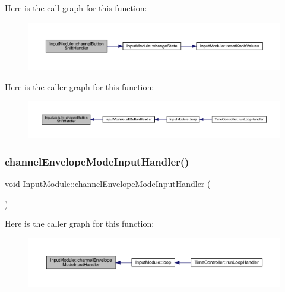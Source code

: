 Here is the call graph for this function\+:
\nopagebreak
\begin{figure}[H]
\begin{center}
\leavevmode
\includegraphics[width=350pt]{class_input_module_a2e678e1a6f2d7b9f91a6e6f1e3125e89_cgraph}
\end{center}
\end{figure}
Here is the caller graph for this function\+:
\nopagebreak
\begin{figure}[H]
\begin{center}
\leavevmode
\includegraphics[width=350pt]{class_input_module_a2e678e1a6f2d7b9f91a6e6f1e3125e89_icgraph}
\end{center}
\end{figure}
\mbox{\label{class_input_module_a0ff214fef897f5dd0bd0384673742996}} 
\subsubsection{\texorpdfstring{channel\+Envelope\+Mode\+Input\+Handler()}{channelEnvelopeModeInputHandler()}}
{\footnotesize\ttfamily void Input\+Module\+::channel\+Envelope\+Mode\+Input\+Handler (\begin{DoxyParamCaption}{ }\end{DoxyParamCaption})}

Here is the caller graph for this function\+:
\nopagebreak
\begin{figure}[H]
\begin{center}
\leavevmode
\includegraphics[width=350pt]{class_input_module_a0ff214fef897f5dd0bd0384673742996_icgraph}
\end{center}
\end{figure}
\mbox{\label{class_input_module_af8193a3e5f84adb8a139d624742b8c6a}} 
